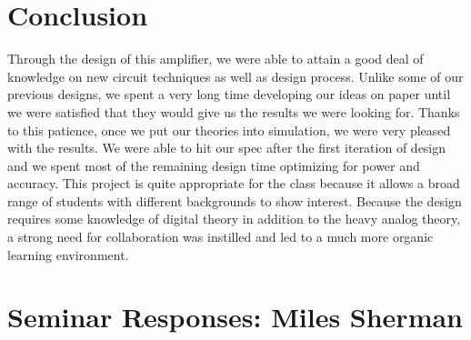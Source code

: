 \documentclass[journal]{IEEEtran}
\begin{document}
\section{Conclusion}
Through the design of this amplifier, we were able to attain a good deal of knowledge on new circuit techniques as well as design process. Unlike some of our previous designs, we spent a very long time developing our ideas on paper until we were satisfied that they would give us the results we were looking for. Thanks to this patience, once we put our theories into simulation, we were very pleased with the results. We were able to hit our spec after the first iteration of design and we spent most of the remaining design time optimizing for power and accuracy.
This project is quite appropriate for the class because it allows a broad range of students with different backgrounds to show interest. Because the design requires some knowledge of digital theory in addition to the heavy analog theory, a strong need for collaboration was instilled and led to a much more organic learning environment. 


%
%
%

%
%

\section{Seminar Responses: Miles Sherman}
\end{document}
